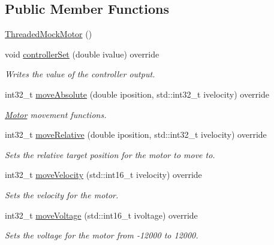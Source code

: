 \subsection*{Public Member Functions}
\begin{DoxyCompactItemize}
\item 
\mbox{\hyperlink{classokapi_1_1ThreadedMockMotor_a035e1504e54fb08dc74b1e1f29647bfe}{Threaded\+Mock\+Motor}} ()
\item 
void \mbox{\hyperlink{classokapi_1_1ThreadedMockMotor_a42501f640bdc5fe64391c72e4991a3f6}{controller\+Set}} (double ivalue) override
\begin{DoxyCompactList}\small\item\em Writes the value of the controller output. \end{DoxyCompactList}\item 
int32\+\_\+t \mbox{\hyperlink{classokapi_1_1ThreadedMockMotor_a12c410b5a9fc55cfad4bc64f970da7be}{move\+Absolute}} (double iposition, std\+::int32\+\_\+t ivelocity) override
\begin{DoxyCompactList}\small\item\em \mbox{\hyperlink{classokapi_1_1Motor}{Motor}} movement functions. \end{DoxyCompactList}\item 
int32\+\_\+t \mbox{\hyperlink{classokapi_1_1ThreadedMockMotor_a3431a448097d84997a8d727f6be2ceac}{move\+Relative}} (double iposition, std\+::int32\+\_\+t ivelocity) override
\begin{DoxyCompactList}\small\item\em Sets the relative target position for the motor to move to. \end{DoxyCompactList}\item 
int32\+\_\+t \mbox{\hyperlink{classokapi_1_1ThreadedMockMotor_ac0df701e407cf12cd4d521eb519217b1}{move\+Velocity}} (std\+::int16\+\_\+t ivelocity) override
\begin{DoxyCompactList}\small\item\em Sets the velocity for the motor. \end{DoxyCompactList}\item 
int32\+\_\+t \mbox{\hyperlink{classokapi_1_1ThreadedMockMotor_a45cf60b263bf3b104e4a2b706fe0b2c7}{move\+Voltage}} (std\+::int16\+\_\+t ivoltage) override
\begin{DoxyCompactList}\small\item\em Sets the voltage for the motor from -\/12000 to 12000. \end{DoxyCompactList}\item 

\end{DoxyCompactItemize}

